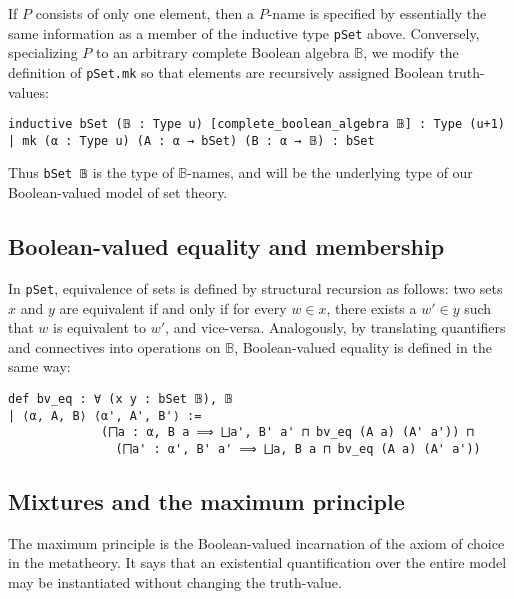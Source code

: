 \documentclass[a4paper,USenglish,cleveref, autoref]{lipics-v2019}
\newcommand{\B}{\mathbb{B}}
\newcommand{\lil}{\lstinline}
\begin{document}
 If $P$ consists of only one element, then a $P$-name is specified by essentially the same information as a member of the inductive type \lstinline{pSet} above. Conversely, specializing $P$ to an arbitrary complete Boolean algebra $\B$, we modify the definition of \lstinline{pSet.mk} so that elements are recursively assigned Boolean truth-values:
\begin{lstlisting}
inductive bSet (𝔹 : Type u) [complete_boolean_algebra 𝔹] : Type (u+1)
| mk (α : Type u) (A : α → bSet) (B : α → 𝔹) : bSet
\end{lstlisting}
Thus \lil{bSet 𝔹} is the type of $\B$-names, and will be the underlying type of our Boolean-valued model of set theory.

\subsection{Boolean-valued equality and membership}

In \lil{pSet}, equivalence of sets is defined by structural recursion as follows: two sets $x$ and $y$ are equivalent if and only if for every $w \in x$, there exists a $w' \in y$ such that $w$ is equivalent to $w'$, and vice-versa. Analogously, by translating quantifiers and connectives into operations on $\B$, Boolean-valued equality is defined in the same way:
\begin{lstlisting}
def bv_eq : ∀ (x y : bSet 𝔹), 𝔹
| ⟨α, A, B⟩ ⟨α', A', B'⟩ :=
             (⨅a : α, B a ⟹ ⨆a', B' a' ⊓ bv_eq (A a) (A' a')) ⊓
               (⨅a' : α', B' a' ⟹ ⨆a, B a ⊓ bv_eq (A a) (A' a'))
\end{lstlisting}


\subsection{Mixtures and the maximum principle}

The maximum principle is the Boolean-valued incarnation of the axiom of choice in the metatheory. It says that an existential quantification over the entire model may be instantiated without changing the truth-value.
\end{document}
